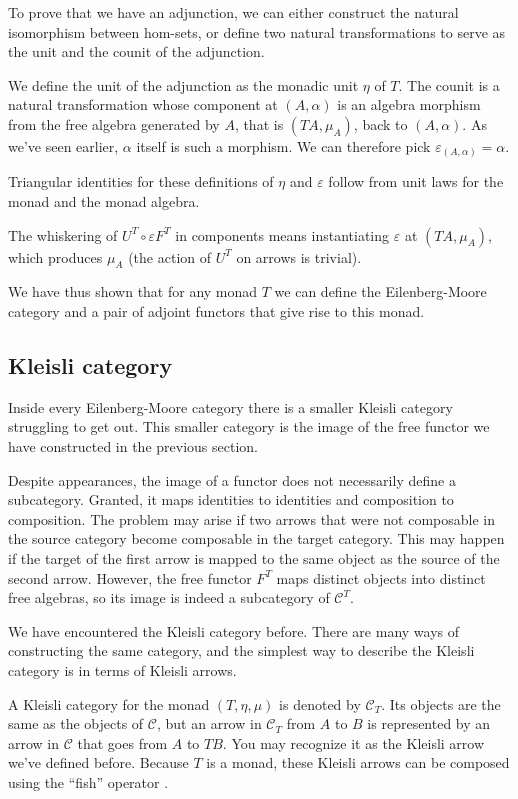 \documentclass[DaoFP]{subfiles}
\begin{document}
To prove that we have an adjunction, we can either construct the natural isomorphism between hom-sets, or define two natural transformations to serve as the unit and the counit of the adjunction. 

We define the unit of the adjunction as the monadic unit $\eta$ of $T$. The counit is a natural transformation whose component at $(A, \alpha)$ is an algebra morphism from the free algebra generated by $A$, that is $(T A, \mu_A)$, back to $(A, \alpha)$. As we've seen earlier, $\alpha$ itself is such a morphism. We can therefore pick $\varepsilon_{(A, \alpha)} = \alpha$.

Triangular identities for these definitions of $\eta$ and $\varepsilon$ follow from unit laws for the monad and the monad algebra.

The whiskering of $U^T \circ \varepsilon F^T$ in components means instantiating $\varepsilon$ at $(T A, \mu_A)$, which produces $\mu_A$ (the action of $U^T$ on arrows is trivial). 

We have thus shown that for any monad $T$ we can define the Eilenberg-Moore category and a pair of adjoint functors that give rise to this monad.

\subsection{Kleisli category}

Inside every Eilenberg-Moore category there is a smaller Kleisli category struggling to get out. This smaller category is the image of the free functor we have constructed in the previous section. 

Despite appearances, the image of a functor does not necessarily define a subcategory. Granted, it maps identities to identities and composition to composition. The problem may arise if two arrows that were not composable in the source category become composable in the target category. This may happen if the target of the first arrow is mapped to the same object as the source of the second arrow. However, the free functor $F^T$ maps distinct objects into distinct free algebras, so its image is indeed a subcategory of $\mathcal{C}^T$.

We have encountered the Kleisli category before. There are many ways of constructing the same category, and the simplest way to describe the Kleisli category is in terms of Kleisli arrows. 

A Kleisli category for the monad $(T, \eta, \mu)$ is denoted by $\mathcal{C}_T$. Its objects are the same as the objects of $\mathcal{C}$, but an arrow in $\mathcal{C}_T$ from $A$ to $B$ is represented by an arrow in $\mathcal{C}$ that goes from $A$ to $T B$. You may recognize it as the Kleisli arrow  we've defined before. Because $T$ is a monad, these Kleisli arrows can be composed using the ``fish'' operator \hask{<=<}. 
\end{document}
